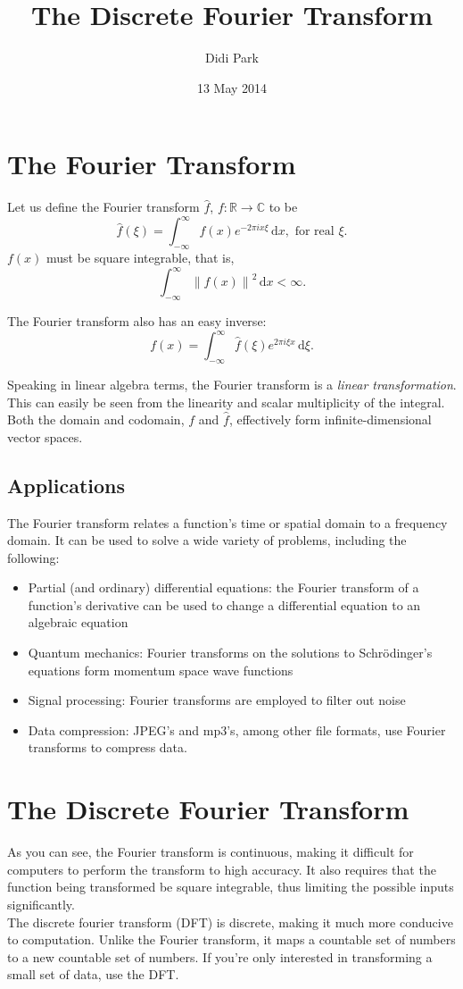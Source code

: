 \documentclass[11pt]{article}
\title{The Discrete Fourier Transform}
\author{Didi Park}
\date{13 May 2014}
\begin{document}
\maketitle

\section{The Fourier Transform}
Let us define the Fourier transform $\hat{f}$, $f: \mathbb{R}\rightarrow\mathbb{C}$ to be
$$\hat{f}(\xi)=\int_{-\infty}^{\infty}f(x)e^{-2\pi i x \xi}\, \mathrm{d}x, \textrm{ for real }\xi.$$
$f(x)$ must be square integrable, that is,
$$\int_{-\infty}^{\infty} {\| f(x) \|}^2\,  \mathrm{d}x <\infty.$$

The Fourier transform also has an easy inverse:
$$f(x)=\int_{-\infty}^{\infty} \hat{f}(\xi)e^{2\pi i \xi x}\, \mathrm{d}\xi.$$

Speaking in linear algebra terms, the Fourier transform is a \emph{linear transformation}. This can easily be seen from the linearity and scalar multiplicity of the integral. Both the domain and codomain, $f$ and $\hat{f}$, effectively form infinite-dimensional vector spaces.
\subsection{Applications}
The Fourier transform relates a function's time or spatial domain to a frequency domain. 
It can be used to solve a wide variety of problems, including the following:
\begin{itemize}
\item Partial (and ordinary) differential equations: the Fourier transform of a function's derivative can be used to change a differential equation to an algebraic equation
\item Quantum mechanics: Fourier transforms on the solutions to Schr\"{o}dinger's equations form momentum space wave functions
\item Signal processing: Fourier transforms are employed to filter out noise
\item Data compression: JPEG's and mp3's, among other file formats, use Fourier transforms to compress data.
\end{itemize}

\section{The Discrete Fourier Transform}
As you can see, the Fourier transform is continuous, making it difficult for computers to perform the transform to high accuracy. It also requires that the function being transformed be square integrable, thus limiting the possible inputs significantly.\\
The discrete fourier transform (DFT) is discrete, making it much more conducive to computation. Unlike the Fourier transform, it maps a countable set of numbers to a new countable set of numbers. If you're only interested in transforming a small set of data, use the DFT.
\end{document}
